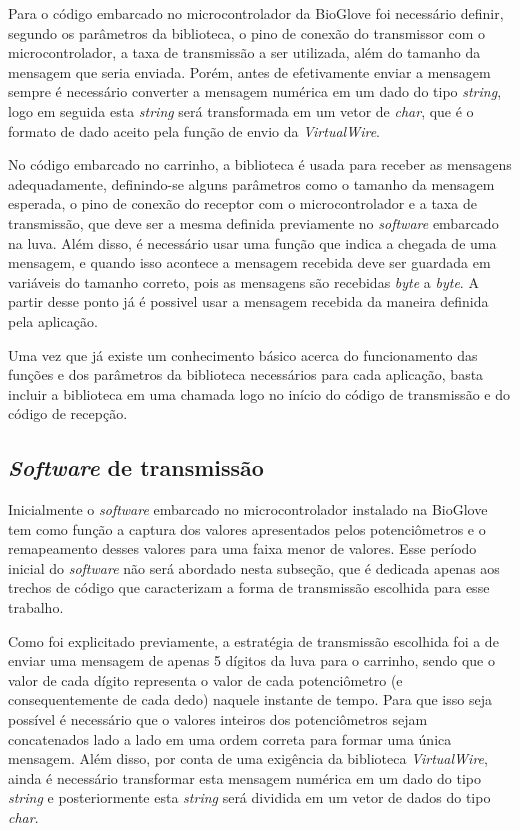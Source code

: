 \documentclass[
	12pt,				%
	openright,			%
	oneside,			%
	a4paper,			%
	english,			%
	brazil				%
	]{abntex2}
\begin{document}
		Para o código embarcado no microcontrolador da BioGlove foi necessário definir, segundo os parâmetros da biblioteca, o pino de conexão do transmissor com o microcontrolador, a taxa de transmissão a ser utilizada, além do tamanho da mensagem que seria enviada. Porém, antes de efetivamente enviar a mensagem sempre é necessário converter a mensagem numérica em um dado do tipo \textit{string}, logo em seguida esta \textit{string} será transformada em um vetor de \textit{char}, que é o formato de dado aceito pela função de envio da \textit{VirtualWire}.

		No código embarcado no carrinho, a biblioteca é usada para receber as mensagens adequadamente, definindo-se alguns parâmetros como o tamanho da mensagem esperada, o pino de conexão do receptor com o microcontrolador e a taxa de transmissão, que deve ser a mesma definida previamente no \textit{software} embarcado na luva. Além disso, é necessário usar uma função que indica a chegada de uma mensagem, e quando isso acontece a mensagem recebida deve ser guardada em variáveis do tamanho correto, pois as mensagens são recebidas \textit{byte} a \textit{byte}. A partir desse ponto já é possivel usar a mensagem recebida da maneira definida pela aplicação.

		Uma vez que já existe um conhecimento básico acerca do funcionamento das funções e dos parâmetros da biblioteca necessários para cada aplicação, basta incluir a biblioteca em uma chamada logo no início do código de transmissão e do código de recepção.



		\subsection{\textit{Software} de transmissão}

		Inicialmente o \textit{software} embarcado no microcontrolador instalado na BioGlove tem como função a captura dos valores apresentados pelos potenciômetros e o remapeamento desses valores para uma faixa menor de valores. Esse período inicial do \textit{software} não será abordado nesta subseção, que é dedicada apenas aos trechos de código que caracterizam a forma de transmissão escolhida para esse trabalho.

		Como foi explicitado previamente, a estratégia de transmissão escolhida foi a de enviar uma mensagem de apenas 5 dígitos da luva para o carrinho, sendo que o valor de cada dígito representa o valor de cada potenciômetro (e consequentemente de cada dedo) naquele instante de tempo. Para que isso seja possível é necessário que o valores inteiros dos potenciômetros sejam concatenados lado a lado em uma ordem correta para formar uma única mensagem. Além disso, por conta de uma exigência da biblioteca \textit{VirtualWire}, ainda é necessário transformar esta mensagem numérica em um dado do tipo \textit{string} e posteriormente esta \textit{string} será dividida em um vetor de dados do tipo \textit{char}.	
		
\end{document}
